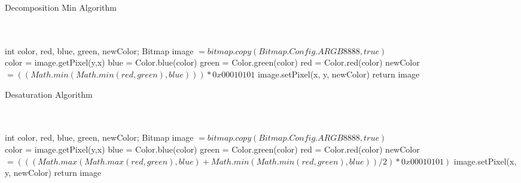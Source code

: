 \documentclass[11pt]{article}
\begin{document}
\begin{algorithm}
   \caption{Decomposition Min Algorithm}
    \begin{algorithmic}[1]
      \\
		\\
        \State int color, red, blue, green, newColor;
        \State  Bitmap image $= bitmap.copy(Bitmap.Config.ARGB8888, true)$
\\
            		\State color = image.getPixel(y,x)
            		\State blue = Color.blue(color)
            		\State green = Color.green(color)
            		\State red = Color.red(color)
            		\State newColor $= ((Math.min(Math.min(red, green), blue)))*0x00010101$
                \State image.setPixel(x, y, newColor)
        		\EndFor
        \EndFor
        \State return image
       \EndFunction

\end{algorithmic}
\end{algorithm}

\begin{algorithm}
   \caption{Desaturation Algorithm}
    \begin{algorithmic}[1]
      \\
		\\
        \State int color, red, blue, green, newColor;
        \State  Bitmap image $= bitmap.copy(Bitmap.Config.ARGB8888, true)$
\\
            		\State color = image.getPixel(y,x)
            		\State blue = Color.blue(color)
            		\State green = Color.green(color)
            		\State red = Color.red(color)
            		\State newColor $= (((Math.max(Math.max(red, green), blue) + Math.min(Math.min(red, green),
                        blue))/2) *0x00010101)$
                \State image.setPixel(x, y, newColor)
        		\EndFor
        \EndFor
        \State return image
       \EndFunction

\end{algorithmic}
\end{algorithm}
\end{document}
